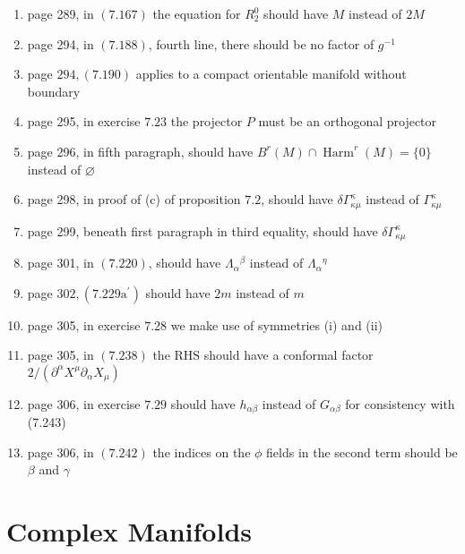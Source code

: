 \documentclass{article}
\begin{document}
\begin{enumerate}
\item page 289, in $(7.167)$ the equation for $R_{2}^{0}$ should have $M$ instead of $2 M$

\item page 294, in $(7.188)$, fourth line, there should be no factor of $g^{-1}$

\item page $294,(7.190)$ applies to a compact orientable manifold without boundary

\item page 295, in exercise $7.23$ the projector $P$ must be an orthogonal projector

\item page 296, in fifth paragraph, should have $B^{r}(M) \cap \operatorname{Harm}^{r}(M)=\{0\}$ instead of $\varnothing$

\item page 298, in proof of (c) of proposition $7.2$, should have $\delta \Gamma_{\kappa \mu}^{\kappa}$ instead of $\Gamma_{\kappa \mu}^{\kappa}$

\item page 299, beneath first paragraph in third equality, should have $\delta \Gamma_{\kappa \mu}^{\kappa}$

\item page 301, in $(7.220)$, should have $\Lambda_{\alpha}{ }^{\beta}$ instead of $\Lambda_{\alpha}{ }^{\eta}$

\item page $302,\left(7.229 \mathrm{a}^{\prime}\right)$ should have $2 m$ instead of $m$

\item page 305, in exercise $7.28$ we make use of symmetries (i) and (ii)

\item page 305, in $(7.238)$ the $\mathrm{RHS}$ should have a conformal factor $2 /\left(\partial^{\alpha} X^{\mu} \partial_{\alpha} X_{\mu}\right)$

\item page 306, in exercise $7.29$ should have $h_{\alpha \beta}$ instead of $G_{\alpha \beta}$ for consistency with (7.243)

\item page 306, in $(7.242)$ the indices on the $\phi$ fields in the second term should be $\beta$ and $\gamma$
\end{enumerate}

\section*{Complex Manifolds}
\end{document}

